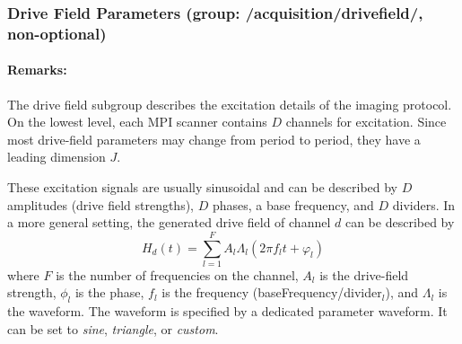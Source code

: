 \documentclass[landscape,a4paper]{article} %
\newcommand{\inlvar}[1]{{\ttfamily#1}}
\begin{document}
\subsubsection{Drive Field Parameters (group: \inlvar{/acquisition/drivefield/}, non-optional)}

\begin{multicols}{2}
\paragraph{Remarks:} The drive field subgroup describes the excitation details of the imaging protocol. On the lowest level, each MPI scanner contains $D$ channels for excitation. Since most drive-field parameters may change from period to period, they have a leading dimension $J$.

These excitation signals are usually sinusoidal and can be described by $D$ amplitudes (drive field strengths), $D$ phases, a base frequency, and $D$ dividers. In a more general setting, the generated drive field of channel $d$ can be described by
$$
H_d(t) = \sum_{l=1}^{F} A_l \Lambda_l (2\pi f_l t + \varphi_l)
$$
where $F$ is the number of frequencies on the channel, $A_l$ is the drive-field strength, $\phi_l$ is the phase, $f_l$ is the frequency (\inlvar{baseFrequency}/\inlvar{divider}$_l$), and $\Lambda_l$ is the waveform. The waveform is specified by a dedicated parameter \inlvar{waveform}. It can be set to \textit{sine}, \textit{triangle}, or \textit{custom}. 
\end{multicols}
\end{document}
